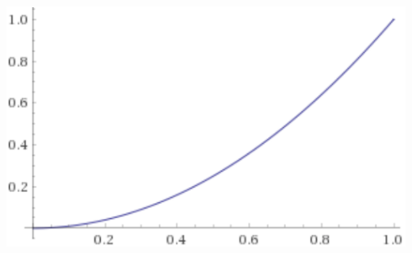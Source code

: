 \documentclass{beamer}
\begin{document}
\begin{frame}
\begin{columns}
\begin{minipage}[c][0.4\textheight][c]{\linewidth}
\end{minipage}
\begin{minipage}[c][0.4\textheight][c]{\linewidth}
  \centering
  \includegraphics[width=0.7\linewidth]{prodDiag}
\end{minipage}
\end{columns}
\end{frame}
\end{document}
